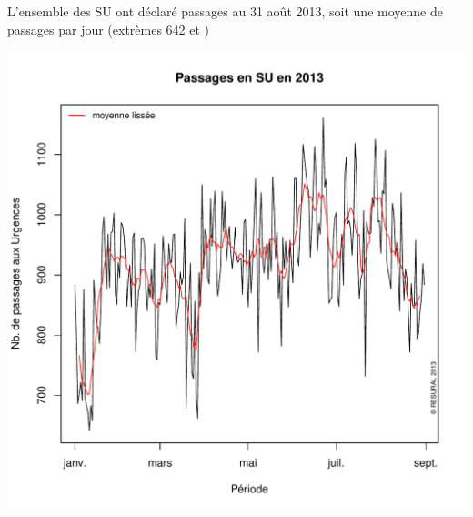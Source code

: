 \documentclass[12pt,english,french,twoside]{report}\usepackage[]{graphicx}\usepackage[]{color}
\makeatletter
\def\maxwidth{ %
  \ifdim\Gin@nat@width>\linewidth
    \linewidth
  \else
    \Gin@nat@width
  \fi
}
\newenvironment{knitrout}{}{} %
\makeatother
\begin{document}



L'ensemble des SU ont déclaré  passages au 31 août 2013, 
soit une moyenne de  passages par jour (extrèmes 642 et )

\begin{knitrout}
\color{fgcolor}
\includegraphics[width=\maxwidth]{figure/activite_plot} 

\end{knitrout}
\end{document}
